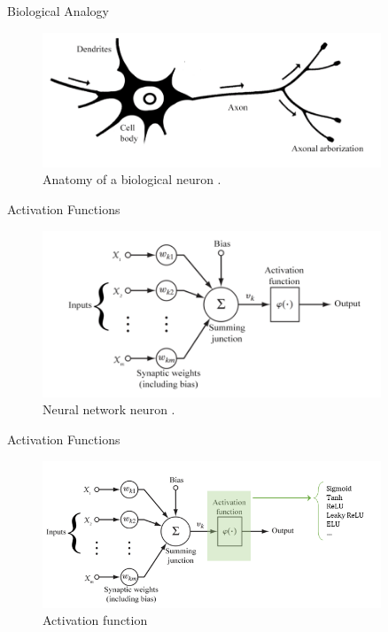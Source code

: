 \begin{frame}{Biological Analogy}
	\begin{figure}[H]
		\centering
		\includegraphics[width=0.9\textwidth]{Figs/biological_neuron.png}
		\caption{Anatomy of a biological neuron \cite{biological-and-nn-neuron}.}
	\end{figure}
\end{frame}

\begin{frame}{Activation Functions}
	\begin{figure}[H]
		\centering
		\includegraphics[width=0.9\textwidth]{Figs/nn_neuron.png}
		\caption{Neural network neuron \cite{biological-and-nn-neuron}.}
	\end{figure}
\end{frame}

\begin{frame}{Activation Functions}
	\begin{figure}[H]
		\centering
		\includegraphics[width=0.9\textwidth]{Figs/activation_function_1.png}
		\caption{Activation function}
	\end{figure}
\end{frame}

